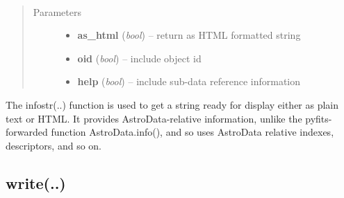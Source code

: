 \documentclass[letterpaper,10pt,english]{sphinxmanual}
\begin{document}
\begin{fulllineitems}
\label{chapter_AstroDataClass:astrodata.data.AstroData.infostr}~\begin{quote}\begin{description}
\item[{Parameters}] \leavevmode\begin{itemize}
\item {} 
\textbf{as\_html} (\emph{bool}) -- return as HTML formatted string

\item {} 
\textbf{oid} (\emph{bool}) -- include object id

\item {} 
\textbf{help} (\emph{bool}) -- include sub-data reference information

\end{itemize}

\end{description}\end{quote}

The infostr(..) function is used to get a string ready for display
either as plain text or HTML.  It provides AstroData-relative
information, unlike the pyfits-forwarded function AstroData.info(),
and so uses AstroData relative indexes, descriptors, and so on.

\end{fulllineitems}



\subsection{write(..)}
\label{chapter_AstroDataClass:write}
\end{document}
